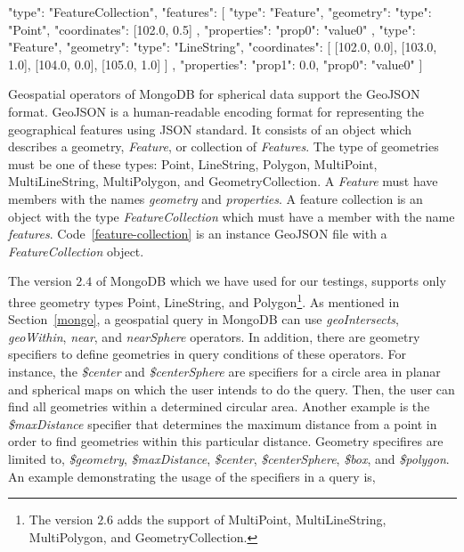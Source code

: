 \documentclass[a4paper,12pt]{article}
\begin{document}
\vspace{10px}
\begin{fakeXML}[label=feature-collection,caption=A GeoJSON file containing a \textit{FeatureCollection} object]
{
  "type": "FeatureCollection",
  "features": [
    {
      "type": "Feature",
      "geometry": {
        "type": "Point",
        "coordinates": [102.0, 0.5]
      },
      "properties": {
        "prop0": "value0"
      }
    },
    {
      "type": "Feature",
      "geometry": {
        "type": "LineString",
        "coordinates": [
          [102.0, 0.0], [103.0, 1.0], [104.0, 0.0], [105.0, 1.0]
        ]
      },
      "properties": {
        "prop1": 0.0,
        "prop0": "value0"
      }
    }
  ]
}
\end{fakeXML}
\vspace{10px}


Geospatial operators of MongoDB for spherical data support the GeoJSON~\cite{www/geojson} format. GeoJSON is a human-readable encoding format for representing the geographical features using JSON standard. It consists of an object which describes a geometry, \textit{Feature}, or collection of \textit{Features}. The type of geometries must be one of these types: Point, LineString, Polygon, MultiPoint, MultiLineString, MultiPolygon, and GeometryCollection. A \textit{Feature} must have members with the names \textit{geometry} and \textit{properties}. A feature collection is an object with the type \textit{FeatureCollection} which must have a member with the name \textit{features}. Code~\ref{feature-collection} is an instance GeoJSON file with a \textit{FeatureCollection} object.

The version $2.4$ of MongoDB which we have used for our testings, supports only three geometry types Point, LineString, and Polygon\footnote{The version $2.6$ adds the support of MultiPoint, MultiLineString, MultiPolygon, and GeometryCollection.}. As mentioned in Section~\ref{mongo}, a geospatial query in MongoDB can use \textit{geoIntersects}, \textit{geoWithin}, \textit{near}, and \textit{nearSphere} operators. In addition, there are geometry specifiers to define geometries in query conditions of these operators. For instance, the \textit{\$center} and \textit{\$centerSphere} are specifiers for a circle area in planar and spherical maps on which the user intends to do the query. Then, the user can find all geometries within a determined circular area. Another example is the \textit{\$maxDistance} specifier that determines the maximum distance from a point in order to find geometries within this particular distance. Geometry specifires are limited to, \textit{\$geometry}, \textit{\$maxDistance}, \textit{\$center}, \textit{\$centerSphere}, \textit{\$box}, and \textit{\$polygon}. An example demonstrating the usage of the specifiers in a query is,
\vspace{10px}
 \vspace{10px}
 
\end{document}
